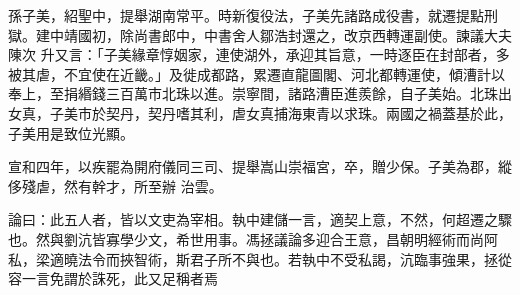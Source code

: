 \begin{pinyinscope}
 孫子美，紹聖中，提舉湖南常平。時新復役法，子美先諸路成役書，就遷提點刑獄。建中靖國初，除尚書郎中，中書舍人鄒浩封還之，改京西轉運副使。諫議大夫陳次
 升又言：「子美緣章惇姻家，連使湖外，承迎其旨意，一時逐臣在封部者，多被其虐，不宜使在近畿。」及徙成都路，累遷直龍圖閣、河北都轉運使，傾漕計以奉上，至捐緡錢三百萬市北珠以進。崇寧間，諸路漕臣進羨餘，自子美始。北珠出女真，子美市於契丹，契丹嗜其利，虐女真捕海東青以求珠。兩國之禍蓋基於此，子美用是致位光顯。



 宣和四年，以疾罷為開府儀同三司、提舉嵩山崇福宮，卒，贈少保。子美為郡，縱侈殘虐，然有幹才，所至辦
 治雲。



 論曰：此五人者，皆以文吏為宰相。執中建儲一言，適契上意，不然，何超遷之驟也。然與劉沆皆寡學少文，希世用事。馮拯議論多迎合王意，昌朝明經術而尚阿私，梁適曉法令而挾智術，斯君子所不與也。若執中不受私謁，沆臨事強果，拯從容一言免謂於誅死，此又足稱者焉



\end{pinyinscope}